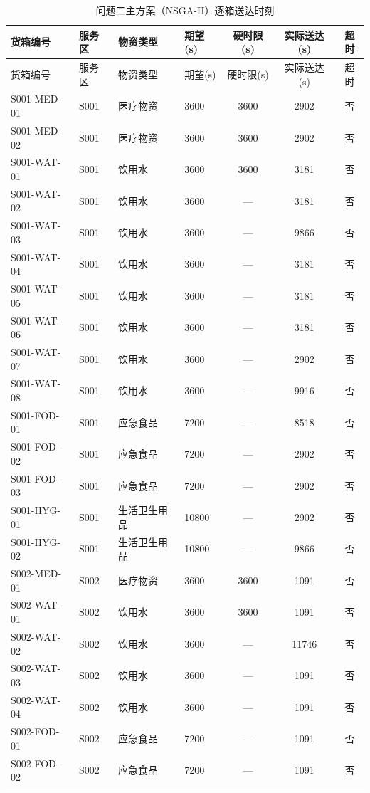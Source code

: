 ﻿\begin{center}\small\renewcommand{\arraystretch}{1.05}
\begin{longtable}{llllccc}
\caption{问题二主方案（NSGA-II）逐箱送达时刻}\label{app:q2_boxes}\\
\hline
货箱编号 & 服务区 & 物资类型 & 期望(s) & 硬时限(s) & 实际送达(s) & 超时 \\
\hline\endfirsthead
\hline 货箱编号 & 服务区 & 物资类型 & 期望(s) & 硬时限(s) & 实际送达(s) & 超时 \\\hline\endhead
S001-MED-01 & S001 & 医疗物资 & 3600 & 3600 & 2902 & 否 \\
S001-MED-02 & S001 & 医疗物资 & 3600 & 3600 & 2902 & 否 \\
S001-WAT-01 & S001 & 饮用水 & 3600 & 3600 & 3181 & 否 \\
S001-WAT-02 & S001 & 饮用水 & 3600 & — & 3181 & 否 \\
S001-WAT-03 & S001 & 饮用水 & 3600 & — & 9866 & 否 \\
S001-WAT-04 & S001 & 饮用水 & 3600 & — & 3181 & 否 \\
S001-WAT-05 & S001 & 饮用水 & 3600 & — & 3181 & 否 \\
S001-WAT-06 & S001 & 饮用水 & 3600 & — & 3181 & 否 \\
S001-WAT-07 & S001 & 饮用水 & 3600 & — & 2902 & 否 \\
S001-WAT-08 & S001 & 饮用水 & 3600 & — & 9916 & 否 \\
S001-FOD-01 & S001 & 应急食品 & 7200 & — & 8518 & 否 \\
S001-FOD-02 & S001 & 应急食品 & 7200 & — & 2902 & 否 \\
S001-FOD-03 & S001 & 应急食品 & 7200 & — & 2902 & 否 \\
S001-HYG-01 & S001 & 生活卫生用品 & 10800 & — & 2902 & 否 \\
S001-HYG-02 & S001 & 生活卫生用品 & 10800 & — & 9866 & 否 \\
S002-MED-01 & S002 & 医疗物资 & 3600 & 3600 & 1091 & 否 \\
S002-WAT-01 & S002 & 饮用水 & 3600 & 3600 & 1091 & 否 \\
S002-WAT-02 & S002 & 饮用水 & 3600 & — & 11746 & 否 \\
S002-WAT-03 & S002 & 饮用水 & 3600 & — & 1091 & 否 \\
S002-WAT-04 & S002 & 饮用水 & 3600 & — & 1091 & 否 \\
S002-FOD-01 & S002 & 应急食品 & 7200 & — & 1091 & 否 \\
S002-FOD-02 & S002 & 应急食品 & 7200 & — & 1091 & 否 \\

\end{longtable}
\end{center}
